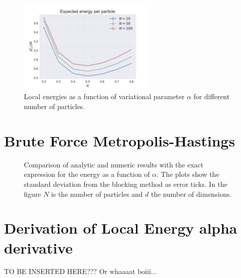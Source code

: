 \documentclass[
    a4paper, aps, twocolumn, floatfix, superscriptaddress, nofootinbib]{revtex4-1}
\newcommand{\1}{\mathds{1}}
\begin{document}
         \begin{figure}
             \includegraphics[width=250px]{../data/figures/problem_e.pdf}
             \caption{Local energies as a function of variational parameter $\alpha$
             				 for different number of particles.}
             \label{fig:interacting}
         \end{figure}

\appendix
\section{Brute Force Metropolis-Hastings}

    \begin{figure}
        \caption{Comparison of analytic and numeric results with the exact
        expression for the energy as a function of $\alpha$. The plots show the
        standard deviation from the blocking method as error ticks. In the
        figure $N$ is the number of particles and $d$ the number of dimensions.}
        \label{fig:initial_problem_b}
    \end{figure}

\section{Derivation of Local Energy alpha derivative}

TO BE INSERTED HERE??? Or whaaaat boiii...


\end{document}

